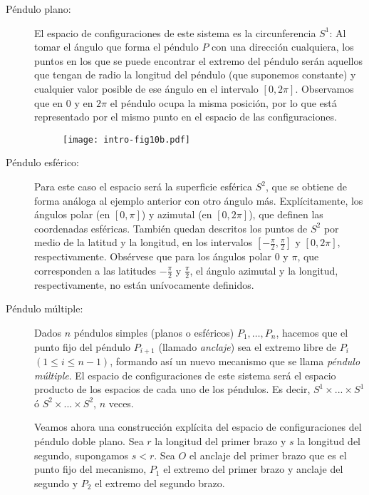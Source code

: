 \documentclass[../VD.tex]{subfiles}
\begin{document}
\begin{description}
	
\item[Péndulo plano:] El espacio de configuraciones de este sistema es la
  circunferencia $S^{1}$: Al tomar el ángulo que forma el péndulo $P$ con una
  dirección cualquiera, los puntos en los que se puede encontrar el extremo del
  péndulo serán aquellos que tengan de radio la longitud del péndulo (que
  suponemos constante) y cualquier valor posible de ese ángulo en el intervalo
  $[0,2\pi]$. Observamos que en $0$ y en $2\pi$ el péndulo ocupa la misma
  posición, por lo que está representado por el mismo punto en el espacio de las
  configuraciones.

  \begin{figure}[ht]
    \centering
    \texttt{[image: intro-fig10b.pdf]} %
    \caption{}
    \label{fig10b}
  \end{figure}
  
\item[Péndulo esférico:] Para este caso el espacio será la superficie esférica
  $S^{2}$, que se obtiene de forma análoga al ejemplo anterior con otro ángulo
  más. Explícitamente, los ángulos polar (en $[0,\pi]$) y azimutal (en
  $[0,2\pi]$), que definen las coordenadas esféricas.
  También quedan descritos los puntos de $S^{2}$ por medio de la latitud y la
  longitud, en los intervalos $[-\frac{\pi}{2},\frac{\pi}{2}]$ y $[0,2\pi]$,
  respectivamente. Obsérvese que para los ángulos polar $0$ y $\pi$, que
  corresponden a las latitudes $-\frac{\pi}{2}$ y $\frac{\pi}{2}$, el ángulo
  azimutal y la longitud, respectivamente, no están unívocamente definidos.

\item[Péndulo múltiple:] Dados $n$ péndulos simples (planos o esféricos)
  $P_1,\dots,P_n$, hacemos que el punto fijo del péndulo $P_{i+1}$ (llamado
  \emph{anclaje}) sea el extremo libre de $P_i$ $(1\leq i \leq n-1)$, formando
  así un nuevo mecanismo que se llama \emph{péndulo múltiple}. El espacio de
  configuraciones de este sistema será el espacio producto de los espacios de
  cada uno de los péndulos. Es decir, $S^1\times ... \times S^1$ ó $S^2 \times
  ... \times S^2$, $n$ veces.
  
  Veamos ahora una construcción explícita del espacio de configuraciones del
  péndulo doble plano. Sea $r$ la longitud del primer brazo y $s$ la longitud
  del segundo, supongamos $s<r$. Sea $O$ el anclaje del primer brazo que es el
  punto fijo del mecanismo, $P_1$ el extremo del primer brazo y anclaje del
  segundo y $P_2$ el extremo del segundo brazo.
  

\end{description}
\end{document}
